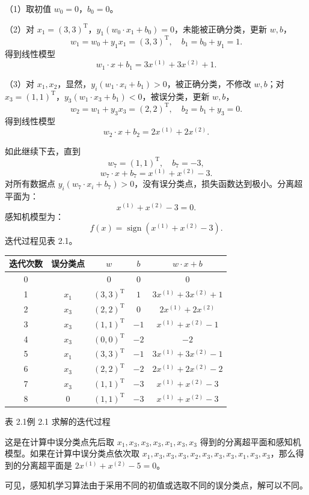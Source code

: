 \documentclass[UTF8,12pt,a4paper,fontset=fandol]{ctexart}
\begin{document}
（1）取初值 $w_0=0$，$b_0=0$。

（2）对 $x_1=(3,3)^\mathrm{T}$，$y_1(w_0\cdot x_1+b_0)=0$，未能被正确分类，更新 $w,b$，
\[
  w_1=w_0+y_1x_1=(3,3)^\mathrm{T},\quad b_1=b_0+y_1=1.
\]
得到线性模型
\[
  w_1\cdot x+b_1=3x^{(1)}+3x^{(2)}+1.
\]

（3）对 $x_1,x_2$，显然，$y_i(w_1\cdot x_i+b_1)>0$，被正确分类，不修改 $w,b$；对 $x_3=(1,1)^\mathrm{T}$，$y_3(w_1\cdot x_3+b_1)<0$，被误分类，更新 $w,b$，
\[
  w_2=w_1+y_3x_3=(2,2)^\mathrm{T},\quad b_2=b_1+y_3=0.
\]
得到线性模型
\[
  w_2\cdot x+b_2=2x^{(1)}+2x^{(2)}.
\]

如此继续下去，直到
\[
  w_7=(1,1)^\mathrm{T},\quad b_7=-3,
\]
\[
  w_7\cdot x+b_7=x^{(1)}+x^{(2)}-3.
\]
对所有数据点 $y_i(w_7\cdot x_i+b_7)>0$，没有误分类点，损失函数达到极小。分离超平面为：
\[
  x^{(1)}+x^{(2)}-3=0.
\]
感知机模型为：
\[
  f(x)=\operatorname{sign}(x^{(1)}+x^{(2)}-3).
\]
迭代过程见表 2.1。

\begin{center}
\begin{tabular}{c c c c c}
\hline
迭代次数 & 误分类点 & $w$ & $b$ & $w\cdot x+b$\\
\hline
0 &  & $0$ & $0$ & $0$\\
1 & $x_1$ & $(3,3)^\mathrm{T}$ & $1$ & $3x^{(1)}+3x^{(2)}+1$\\
2 & $x_3$ & $(2,2)^\mathrm{T}$ & $0$ & $2x^{(1)}+2x^{(2)}$\\
3 & $x_3$ & $(1,1)^\mathrm{T}$ & $-1$ & $x^{(1)}+x^{(2)}-1$\\
4 & $x_3$ & $(0,0)^\mathrm{T}$ & $-2$ & $-2$\\
5 & $x_1$ & $(3,3)^\mathrm{T}$ & $-1$ & $3x^{(1)}+3x^{(2)}-1$\\
6 & $x_3$ & $(2,2)^\mathrm{T}$ & $-2$ & $2x^{(1)}+2x^{(2)}-2$\\
7 & $x_3$ & $(1,1)^\mathrm{T}$ & $-3$ & $x^{(1)}+x^{(2)}-3$\\
8 & $0$ & $(1,1)^\mathrm{T}$ & $-3$ & $x^{(1)}+x^{(2)}-3$\\
\hline
\end{tabular}

表 2.1\quad 例 2.1 求解的迭代过程
\end{center}

这是在计算中误分类点先后取 $x_1,x_3,x_3,x_3,x_1,x_3,x_3$ 得到的分离超平面和感知机模型。如果在计算中误分类点依次取 $x_1,x_3,x_3,x_3,x_2,x_3,x_3,x_3,x_1,x_3,x_3$，那么得到的分离超平面是 $2x^{(1)}+x^{(2)}-5=0$。

可见，感知机学习算法由于采用不同的初值或选取不同的误分类点，解可以不同。
\end{document}
